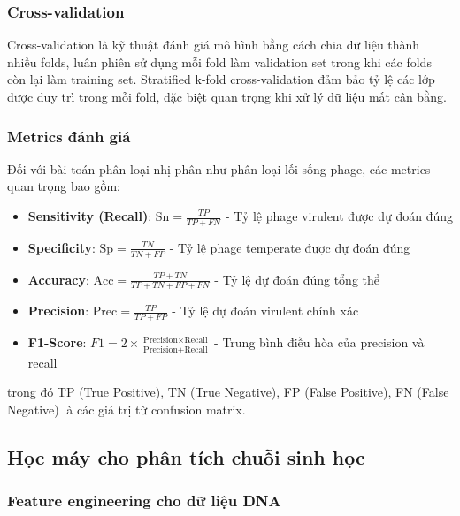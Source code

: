 \subsubsection{Cross-validation}

Cross-validation là kỹ thuật đánh giá mô hình bằng cách chia dữ liệu thành nhiều folds, luân phiên sử dụng mỗi fold làm validation set trong khi các folds còn lại làm training set. Stratified k-fold cross-validation đảm bảo tỷ lệ các lớp được duy trì trong mỗi fold, đặc biệt quan trọng khi xử lý dữ liệu mất cân bằng.

\subsubsection{Metrics đánh giá}

Đối với bài toán phân loại nhị phân như phân loại lối sống phage, các metrics quan trọng bao gồm:

\begin{itemize}
    \item \textbf{Sensitivity (Recall)}: $\text{Sn} = \frac{TP}{TP + FN}$ - Tỷ lệ phage virulent được dự đoán đúng

    \item \textbf{Specificity}: $\text{Sp} = \frac{TN}{TN + FP}$ - Tỷ lệ phage temperate được dự đoán đúng

    \item \textbf{Accuracy}: $\text{Acc} = \frac{TP + TN}{TP + TN + FP + FN}$ - Tỷ lệ dự đoán đúng tổng thể

    \item \textbf{Precision}: $\text{Prec} = \frac{TP}{TP + FP}$ - Tỷ lệ dự đoán virulent chính xác

    \item \textbf{F1-Score}: $F1 = 2 \times \frac{\text{Precision} \times \text{Recall}}{\text{Precision} + \text{Recall}}$ - Trung bình điều hòa của precision và recall
\end{itemize}

trong đó TP (True Positive), TN (True Negative), FP (False Positive), FN (False Negative) là các giá trị từ confusion matrix.

\subsection{Học máy cho phân tích chuỗi sinh học}

\subsubsection{Feature engineering cho dữ liệu DNA}


